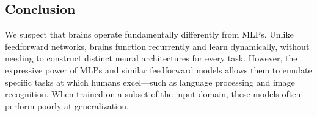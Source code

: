 \documentclass[../../main.tex]{subfiles}
\begin{document}
    

    

    \subsection{Conclusion}
    We suspect that brains operate fundamentally differently from MLPs. Unlike feedforward networks, brains function recurrently and learn dynamically, without needing to construct distinct neural architectures for every task. However, the expressive power of MLPs and similar feedforward models allows them to emulate specific tasks at which humans excel—such as language processing and image recognition. When trained on a subset of the input domain, these models often perform poorly at generalization.
\end{document}
